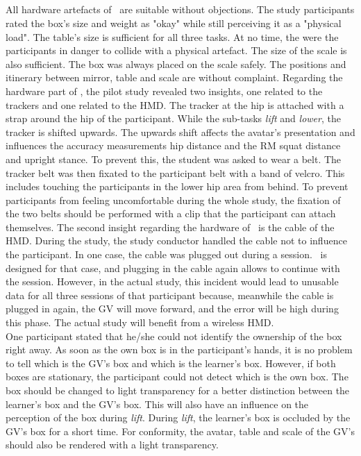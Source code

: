 \subsection{\exgo}
All hardware artefacts of \exgo\ are suitable without objections. The study participants rated the box's size and weight as "okay" while still perceiving it as a "physical load". The table's size is sufficient for all three tasks. At no time, the were the participants in danger to collide with a physical artefact. The size of the scale is also sufficient. The box was always placed on the scale safely. The positions and itinerary between mirror, table and scale are without complaint. Regarding the hardware part of \exgo, the pilot study revealed two insights, one related to the trackers and one related to the HMD. The tracker at the hip is attached with a strap around the hip of the participant. While the sub-tasks \textit{lift} and \textit{lower}, the tracker is shifted upwards. The upwards shift affects the avatar's presentation and influences the accuracy measurements hip distance and the RM squat distance and upright stance. To prevent this, the student was asked to wear a belt. The tracker belt was then fixated to the participant belt with a band of velcro. This includes touching the participants in the lower hip area from behind. To prevent participants from feeling uncomfortable during the whole study, the fixation of the two belts should be performed with a clip that the participant can attach themselves. The second insight regarding the hardware of \exgo\ is the cable of the HMD. During the study, the study conductor handled the cable not to influence the participant. In one case, the cable was plugged out during a session. \exgo\ is designed for that case, and plugging in the cable again allows to continue with the session. However, in the actual study, this incident would lead to unusable data for all three sessions of that participant because, meanwhile the cable is plugged in again, the GV will move forward, and the error will be high during this phase. The actual study will benefit from a wireless HMD.\\
One participant stated that he/she could not identify the ownership of the box right away. As soon as the own box is in the participant's hands, it is no problem to tell which is the GV's box and which is the learner's box. However, if both boxes are stationary, the participant could not detect which is the own box. The box should be changed to light transparency for a better distinction between the learner's box and the GV's box. This will also have an influence on the perception of the box during \textit{lift}. During \textit{lift}, the learner's box is occluded by the GV's box for a short time. For conformity, the avatar, table and scale of the GV's should also be rendered with a light transparency.\\
